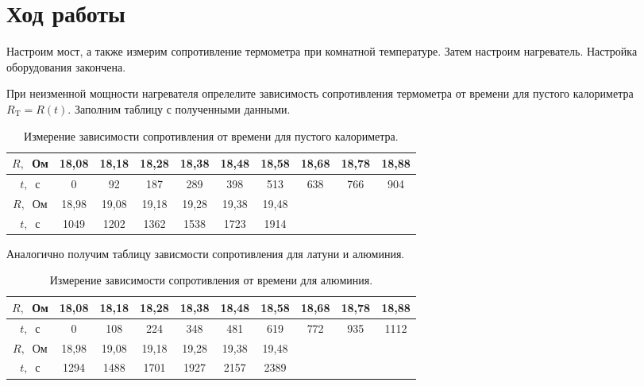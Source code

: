 \section{Ход работы}

Настроим мост, а также измерим сопротивление термометра при комнатной температуре. Затем настроим нагреватель. Настройка оборудования закончена.

При неизменной мощности нагревателя опрелелите зависимость сопротивления термометра от времени для пустого калориметра $R_{\text{T}} = R(t)$. Заполним таблицу с полученными данными.

\FloatBarrier
\begin{center}
	\begin{table}[h]
	\begin{tabular}{| c | c | c | c | c | c | c | c | c | c |} 
	\hline
	$R,~$ Ом & 18,08 & 18,18 & 18,28 & 18,38 & 18,48 & 18,58 & 18,68 & 18,78 & 18,88  \\ \hline
	$t,~$ с & 0 & 92 & 187 & 289 & 398 & 513 & 638 & 766 & 904\\ \hline \hline
	$R,~$ Ом & 18,98 & 19,08 & 19,18 & 19,28 & 19,38 & 19,48 &&&  \\ \hline
	$t,~$ с & 1049 & 1202 & 1362 & 1538 & 1723 & 1914 &&& \\
	\hline
	\end{tabular}
	
	\caption{ Измерение зависимости сопротивления от времени для пустого калориметра.}
	\end{table}
\end{center}
\FloatBarrier

Аналогично получим таблицу зависмости сопротивления для латуни и алюминия.

\FloatBarrier
\begin{center}
	\begin{table}[h]
	\begin{tabular}{| c | c | c | c | c | c | c | c | c | c |} 
	\hline
	$R,~$ Ом & 18,08 & 18,18 & 18,28 & 18,38 & 18,48 & 18,58 & 18,68 & 18,78 & 18,88  \\ \hline
	$t,~$ с & 0 & 108 & 224 & 348 & 481 & 619 & 772 & 935 & 1112 \\ \hline \hline
	$R,~$ Ом & 18,98 & 19,08 & 19,18 & 19,28 & 19,38 & 19,48 &&&  \\ \hline
	$t,~$ с & 1294 & 1488 & 1701 & 1927 & 2157 & 2389  &&& \\
	\hline
	\end{tabular}
	
	\caption{ Измерение зависимости сопротивления от времени для алюминия.}
	\end{table}
\end{center}
\FloatBarrier
 
